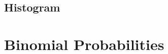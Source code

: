 \documentclass[letterpaper]{article}
\begin{document}
\subsection{Histogram}

\subsection{} %

\subsection{} %

\section{Binomial Probabilities}

\subsection{} %

\subsection{} %
\end{document}
